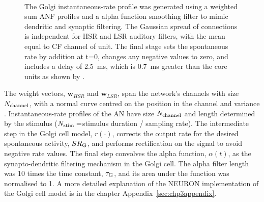  \begin{figure}[h!]
  \centering
  \resizebox{0.9\textwidth}{!}{}\\
  \caption{The Golgi instantaneous-rate profile was generated using a weighted
    sum ANF profiles and a alpha function smoothing filter to mimic dendritic
    and synaptic filtering. The Gaussian spread of connections is independent
    for HSR and LSR auditory filters, with the mean equal to CF channel of
    unit. The final stage sets the spontaneous rate by addition at t=0, changes
    any negative values to zero, and includes a delay of 2.5~ms, which is 0.7~ms
    greater than the core \VCN units as shown by \citet{GhoshalKim:1997}.}
  \label{fig:GolgiDiagram}
 \end{figure}


 The weight vectors, $\mathbf{w}_{HSR}$ and $\mathbf{w}_{LSR}$, span the
 network's channels with size $N_{\rm channel}$, with a normal curve centred on
 the position in the channel and variance \sANFGLG. Instantaneous-rate profiles
 of the AN have size $N_{\rm channel}$ and length determined by the stimulus
 ($N_{\rm stim}=$stimulus duration / sampling rate).  The intermediate step in
 the Golgi cell model, $r(\cdot)$, corrects the output rate for the desired
 spontaneous activity, $\protect SR_{\rm G}$, and performs rectification on the signal to
 avoid negative rate values.  The final step convolves the alpha function,
 $\alpha(t)$, as the synapto-dendritic filtering mechanism in the Golgi
 cell. The alpha filter length was 10 times the time constant, $\protect\tau_{\rm G}$, and its
 area under the function was normalised to 1.  A more detailed explanation of
 the NEURON implementation of the Golgi cell model is in the chapter
 Appendix~\ref{sec:chp3appendix}.  %



